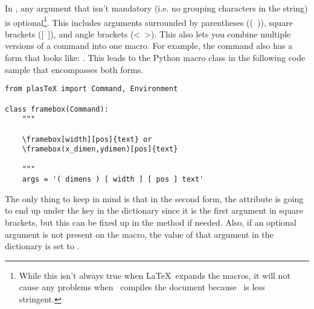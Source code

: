 In \plasTeX, any argument that isn't mandatory (i.e. no grouping characters
in the  string) is optional\footnote{While this isn't always true
when \LaTeX\ expands the macros, it will not cause any problems when
\plasTeX\ compiles the document because \plasTeX\ is less stringent.}.
This includes arguments surrounded by parentheses ((~)), square brackets
([~]), and angle brackets (<~>).  This also lets you combine multiple
versions of a command into one macro.  For example, the 
command also has a form that looks like:
.  This leads to the
Python macro class in the following code sample that encompasses both
forms.
\begin{verbatim}
from plasTeX import Command, Environment

class framebox(Command):
    """

    \framebox[width][pos]{text} or
    \framebox(x_dimen,ydimen)[pos]{text}

    """
    args = '( dimens ) [ width ] [ pos ] text'
\end{verbatim}
The only thing to keep in mind is that in the second form, the 
attribute is going to end up under the  key in the
 dictionary since it is the first argument in
square brackets, but this can be fixed up in the  method
if needed.  Also, if an optional argument is not present on the
macro, the value of that argument in the  dictionary
is set to .

